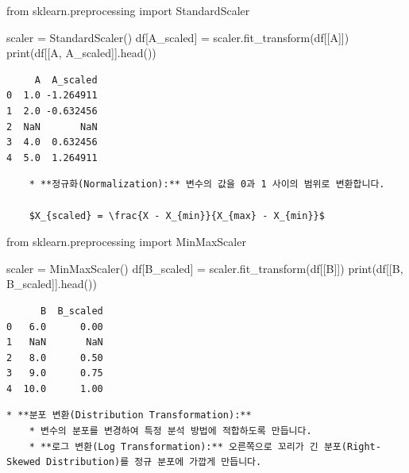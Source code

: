 \documentclass[
  letterpaper,
]{book}
\newenvironment{Shaded}{\begin{snugshade}}{\end{snugshade}}
\newcommand{\BuiltInTok}[1]{\textcolor[rgb]{0.00,0.23,0.31}{#1}}
\newcommand{\ImportTok}[1]{\textcolor[rgb]{0.00,0.46,0.62}{#1}}
\newcommand{\NormalTok}[1]{\textcolor[rgb]{0.00,0.23,0.31}{#1}}
\newcommand{\OperatorTok}[1]{\textcolor[rgb]{0.37,0.37,0.37}{#1}}
\newcommand{\StringTok}[1]{\textcolor[rgb]{0.13,0.47,0.30}{#1}}
\begin{document}
\begin{Shaded}
\begin{Highlighting}[]
    \ImportTok{from}\NormalTok{ sklearn.preprocessing }\ImportTok{import}\NormalTok{ StandardScaler}

\NormalTok{    scaler }\OperatorTok{=}\NormalTok{ StandardScaler()}
\NormalTok{    df[}\StringTok{\textquotesingle{}A\_scaled\textquotesingle{}}\NormalTok{] }\OperatorTok{=}\NormalTok{ scaler.fit\_transform(df[[}\StringTok{\textquotesingle{}A\textquotesingle{}}\NormalTok{]])}
    \BuiltInTok{print}\NormalTok{(df[[}\StringTok{\textquotesingle{}A\textquotesingle{}}\NormalTok{, }\StringTok{\textquotesingle{}A\_scaled\textquotesingle{}}\NormalTok{]].head())}
\end{Highlighting}
\end{Shaded}

\begin{verbatim}
     A  A_scaled
0  1.0 -1.264911
1  2.0 -0.632456
2  NaN       NaN
3  4.0  0.632456
4  5.0  1.264911
\end{verbatim}

\begin{verbatim}
    * **정규화(Normalization):** 변수의 값을 0과 1 사이의 범위로 변환합니다.

    $X_{scaled} = \frac{X - X_{min}}{X_{max} - X_{min}}$
\end{verbatim}

\begin{Shaded}
\begin{Highlighting}[]
    \ImportTok{from}\NormalTok{ sklearn.preprocessing }\ImportTok{import}\NormalTok{ MinMaxScaler}

\NormalTok{    scaler }\OperatorTok{=}\NormalTok{ MinMaxScaler()}
\NormalTok{    df[}\StringTok{\textquotesingle{}B\_scaled\textquotesingle{}}\NormalTok{] }\OperatorTok{=}\NormalTok{ scaler.fit\_transform(df[[}\StringTok{\textquotesingle{}B\textquotesingle{}}\NormalTok{]])}
    \BuiltInTok{print}\NormalTok{(df[[}\StringTok{\textquotesingle{}B\textquotesingle{}}\NormalTok{, }\StringTok{\textquotesingle{}B\_scaled\textquotesingle{}}\NormalTok{]].head())}
\end{Highlighting}
\end{Shaded}

\begin{verbatim}
      B  B_scaled
0   6.0      0.00
1   NaN       NaN
2   8.0      0.50
3   9.0      0.75
4  10.0      1.00
\end{verbatim}

\begin{verbatim}
* **분포 변환(Distribution Transformation):**
    * 변수의 분포를 변경하여 특정 분석 방법에 적합하도록 만듭니다.
    * **로그 변환(Log Transformation):** 오른쪽으로 꼬리가 긴 분포(Right-Skewed Distribution)를 정규 분포에 가깝게 만듭니다.
\end{verbatim}
\end{document}
